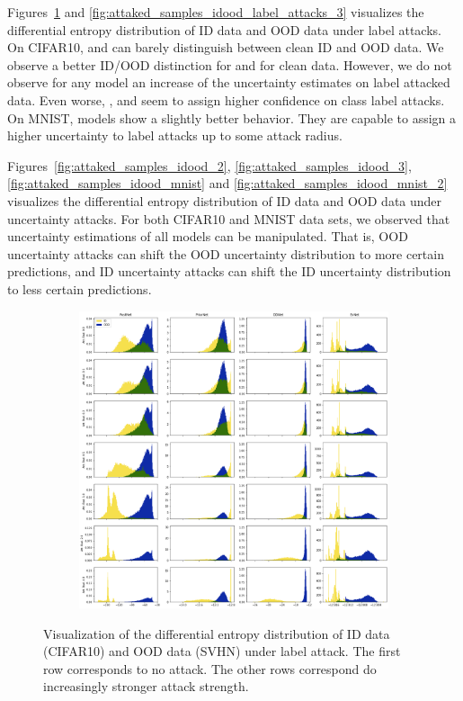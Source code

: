 Figures~\ref{fig:attaked_samples_idood_label_attacks_2} and \ref{fig:attaked_samples_idood_label_attacks_3} visualizes the differential entropy distribution of ID data and OOD data under label attacks. On CIFAR10, \PriorNet and \DDNet can barely distinguish between clean ID and OOD data. We observe a better ID/OOD distinction for \PostNet and \EvNet for clean data. However, we do not observe for any model an increase of the uncertainty estimates on label attacked data. Even worse, \PostNet, \PriorNet and \DDNet seem to assign higher confidence on class label attacks. On MNIST, models show a slightly better behavior. They are capable to assign a higher uncertainty to label attacks up to some attack radius.

Figures~\ref{fig:attaked_samples_idood_2}, \ref{fig:attaked_samples_idood_3}, \ref{fig:attaked_samples_idood_mnist} and \ref{fig:attaked_samples_idood_mnist_2} visualizes the differential entropy distribution of ID data and OOD data under uncertainty attacks. For both CIFAR10 and MNIST data sets, we observed that uncertainty estimations of all models can be manipulated. That is, OOD uncertainty attacks can shift the OOD uncertainty distribution to more certain predictions, and ID uncertainty attacks can shift the ID uncertainty distribution to less certain predictions.


\begin{figure}[ht!]
    \centering
        \begin{subfigure}[t]{1.0\textwidth}
        \centering
        \includegraphics[width=0.99 \textwidth]{sections/008_icml2021/eval/unc_dist_label_id_cifar10_c.png}
    \end{subfigure}%
    \caption{Visualization of the differential entropy distribution of ID data (CIFAR10) and OOD data (SVHN) under label attack. The first row corresponds to no attack. The other rows correspond do increasingly stronger attack strength.}
    \label{fig:attaked_samples_idood_label_attacks_2}
	\vspace{-.5cm}
\end{figure}
\newpage

